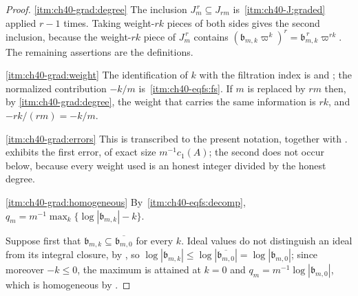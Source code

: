 \begin{proof}
\cref{itm:ch40-grad:degree}  The inclusion $J_m^{\,r}\subseteq J_{rm}$ is
\,\cref{itm:ch40-J:graded} applied $r-1$ times.
Taking weight-$rk$ pieces of both sides gives the second inclusion,
because the weight-$rk$ piece of $J_m^{\,r}$ contains
$(\mathfrak b_{m,k}\varpi^k)^r=\mathfrak b_{m,k}^{\,r}\varpi^{rk}$.  The
remaining assertions are the definitions.

\cref{itm:ch40-grad:weight}  The identification of $k$ with the filtration
index is  and
; the normalized contribution $-k/m$ is
\,\cref{itm:ch40-eqfs:fs}.  If
$m$ is replaced by $rm$ then, by \cref{itm:ch40-grad:degree}, the weight
that carries the same information is $rk$, and
$-rk/(rm)=-k/m$.

\cref{itm:ch40-grad:errors}  This is
 transcribed to the present notation, together
with .   exhibits the first
error, of exact size $m^{-1}c_1(A)$; the second does not occur below,
because every weight used is an honest integer divided by the honest degree.

\cref{itm:ch40-grad:homogeneous}  By
\,\cref{itm:ch40-eqfs:decomp},
$q_m=m^{-1}\max_k\{\log|\mathfrak b_{m,k}|-k\}$.

Suppose first that $\mathfrak b_{m,k}\subseteq\overline{\mathfrak b_{m,0}}$
for every $k$.  Ideal values do not distinguish an ideal from its integral
closure, by , so
$\log|\mathfrak b_{m,k}|\le\log|\overline{\mathfrak b_{m,0}}|
=\log|\mathfrak b_{m,0}|$; since moreover $-k\le0$, the maximum is
attained at $k=0$ and $q_m=m^{-1}\log|\mathfrak b_{m,0}|$, which is
homogeneous by .


\end{proof}
